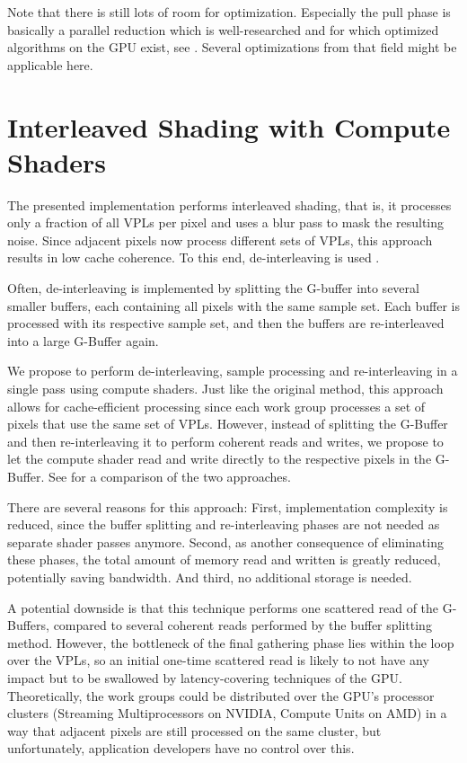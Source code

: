 Note that there is still lots of room for optimization. Especially the pull phase is basically a parallel reduction which is well-researched and for which optimized algorithms on the GPU exist, see  \citet{Harris:2007:ParallelReduction}. Several optimizations from that field might be applicable here.



\section{Interleaved Shading with Compute Shaders}
\label{sec:impl:interleavedShading}

The presented implementation performs interleaved shading, that is, it processes only a fraction of all VPLs per pixel and uses a blur pass to mask the resulting noise. Since adjacent pixels now process different sets of VPLs, this approach results in low cache coherence. To this end, de-interleaving is used \citep{segovia2006non}.

Often, de-interleaving is implemented by splitting the G-buffer into several smaller buffers, each containing all pixels with the same sample set. Each buffer is processed with its respective sample set, and then the buffers are re-interleaved into a large G-Buffer again.

We propose to perform de-interleaving, sample processing and re-interleaving in a single pass using compute shaders. Just like the original method, this approach allows for cache-efficient processing since each work group processes a set of pixels that use the same set of VPLs. However, instead of splitting the G-Buffer and then re-interleaving it to perform coherent reads and writes, we propose to let the compute shader read and write directly to the respective pixels in the G-Buffer. See  for a comparison of the two approaches.


There are several reasons for this approach: First, implementation complexity is reduced, since the buffer splitting and re-interleaving phases are not needed as separate shader passes anymore. Second, as another consequence of eliminating these phases, the total amount of memory read and written is greatly reduced, potentially saving bandwidth. And third, no additional storage is needed.

A potential downside is that this technique performs one scattered read of the G-Buffers, compared to several coherent reads performed by the buffer splitting method. However, the bottleneck of the final gathering phase lies within the loop over the VPLs, so an initial one-time scattered read is likely to not have any impact but to be swallowed by latency-covering techniques of the GPU. Theoretically, the work groups could be distributed over the GPU's processor clusters (Streaming Multiprocessors on NVIDIA, Compute Units on AMD) in a way that adjacent pixels are still processed on the same cluster, but unfortunately, application developers have no control over this.

